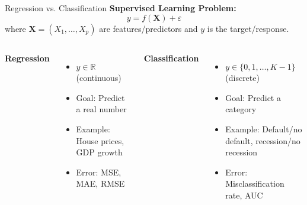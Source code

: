 \documentclass[11pt]{beamer}
\begin{document}
\begin{frame}[fragile]{Regression vs. Classification}
	\textbf{Supervised Learning Problem:}
	\[
		y = f(\mathbf{X}) + \varepsilon
	\]
	where $\mathbf{X} = (X_1, \ldots, X_p)$ are features/predictors and $y$ is the target/response.

	\vspace{0.3cm}

	\begin{columns}
		\textbf{Regression}
		\begin{itemize}
			\setlength{\itemsep}{0.15cm}
			\item $y \in \mathbb{R}$ (continuous)
			\item Goal: Predict a real number
			\item Example: House prices, GDP growth
			\item Error: MSE, MAE, RMSE
		\end{itemize}

		\textbf{Classification}
		\begin{itemize}
			\setlength{\itemsep}{0.15cm}
			\item $y \in \{0, 1, \ldots, K-1\}$ (discrete)
			\item Goal: Predict a category
			\item Example: Default/no default, recession/no recession
			\item Error: Misclassification rate, AUC
		\end{itemize}
	\end{columns}
\end{frame}
\end{document}
